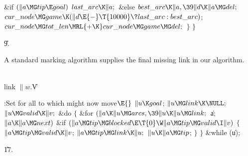 \&{if} ${}(\|a\MG\\{tip}\E\\{goal}){}$\1\5
${}\\{last\_arc}\K\|a;{}$\2\6
\&{else}\1\5
${}\\{best\_arc}\K\|a,\39\|d\K\|a\MG\\{del};{}$\2\2\2\6
${}\\{cur\_node}\MG\\{game}\K(\|d\E{-}\T{10000}\?\\{last\_arc}:\\{best%
\_arc}){}$;\6
${}\\{cur\_node}\MG\\{tot\_len}\MRL{+{\K}}\\{cur\_node}\MG\\{game}\MG%
\\{del};{}$\6
\4${}\}{}$\2\6
\4${}\}{}$\2\par
\U9.\fi

A standard marking algorithm supplies the final missing link in
our algorithm.

\Y\B\4\D\\{link}\5
$\|w.{}$\|V\par
\Y\B\4:Set  for all  to which 
might now move\X${}\E{}$\6
$\|u\K\\{goal}{}$;\6
${}\|u\MG\\{link}\K\NULL;{}$\6
${}\|u\MG\\{valid}\K\|v;{}$\6
\&{do}\5
${}\{{}$\1\6
\&{for} ${}(\|a\K\|u\MG\\{arcs},\39\|u\K\|u\MG\\{link};{}$ \|a; ${}\|a\K\|a\MG%
\\{next}){}$\1\6
\&{if} ${}(\|a\MG\\{tip}\MG\\{blocked}\E\T{0}\W\|a\MG\\{tip}\MG\\{valid}\I%
\|v){}$\5
${}\{{}$\1\6
${}\|a\MG\\{tip}\MG\\{valid}\K\|v{}$;\6
${}\|a\MG\\{tip}\MG\\{link}\K\|u;{}$\6
${}\|u\K\|a\MG\\{tip}{}$;\6
\4${}\}{}$\2\2\6
\4${}\}{}$\5
\2\5
\&{while} (\|u);\par
\U17.\fi


